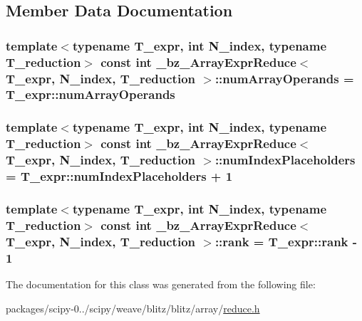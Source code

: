 \subsection{Member Data Documentation}
\hypertarget{class__bz__ArrayExprReduce_a70a9110a2616687cc8d42549a20b4cab}{}
\subsubsection[{num\+Array\+Operands}]{\setlength{\rightskip}{0pt plus 5cm}template$<$typename T\+\_\+expr, int N\+\_\+index, typename T\+\_\+reduction$>$ const int {\bf \+\_\+bz\+\_\+\+Array\+Expr\+Reduce}$<$ T\+\_\+expr, N\+\_\+index, T\+\_\+reduction $>$\+::num\+Array\+Operands = T\+\_\+expr\+::num\+Array\+Operands\hspace{0.3cm}{\ttfamily [static]}}\label{class__bz__ArrayExprReduce_a70a9110a2616687cc8d42549a20b4cab}
\hypertarget{class__bz__ArrayExprReduce_a62c3cf7531f22c50deaebe85d578bb93}{}
\subsubsection[{num\+Index\+Placeholders}]{\setlength{\rightskip}{0pt plus 5cm}template$<$typename T\+\_\+expr, int N\+\_\+index, typename T\+\_\+reduction$>$ const int {\bf \+\_\+bz\+\_\+\+Array\+Expr\+Reduce}$<$ T\+\_\+expr, N\+\_\+index, T\+\_\+reduction $>$\+::num\+Index\+Placeholders = T\+\_\+expr\+::num\+Index\+Placeholders + 1\hspace{0.3cm}{\ttfamily [static]}}\label{class__bz__ArrayExprReduce_a62c3cf7531f22c50deaebe85d578bb93}
\hypertarget{class__bz__ArrayExprReduce_a318d6c53b0d3f9e7ac89e47c7f18cb80}{}
\subsubsection[{rank}]{\setlength{\rightskip}{0pt plus 5cm}template$<$typename T\+\_\+expr, int N\+\_\+index, typename T\+\_\+reduction$>$ const int {\bf \+\_\+bz\+\_\+\+Array\+Expr\+Reduce}$<$ T\+\_\+expr, N\+\_\+index, T\+\_\+reduction $>$\+::rank = T\+\_\+expr\+::rank -\/ 1\hspace{0.3cm}{\ttfamily [static]}}\label{class__bz__ArrayExprReduce_a318d6c53b0d3f9e7ac89e47c7f18cb80}


The documentation for this class was generated from the following file\+:\begin{DoxyCompactItemize}
\item 
packages/scipy-\/0../scipy/weave/blitz/blitz/array/\hyperlink{array_2reduce_8h}{reduce.\+h}\end{DoxyCompactItemize}
